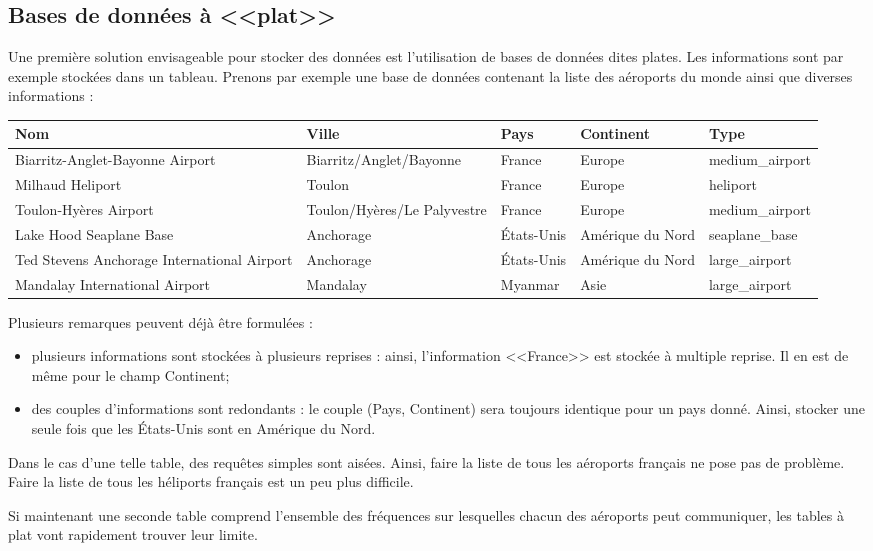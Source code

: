 \documentclass[10pt]{article}
\begin{document}
\subsection{Bases de données à <<plat>>}
Une première solution envisageable pour stocker des données est l'utilisation de bases de données dites plates. Les informations sont par exemple stockées dans un tableau. Prenons par exemple une base de données contenant la liste des aéroports du monde ainsi que diverses informations : 
\begin{center}
\begin{tabular}{p{4cm}llll}
\hline
Nom & Ville & Pays & Continent  & Type \\
\hline
\hline
Biarritz-Anglet-Bayonne Airport & Biarritz/Anglet/Bayonne & France & Europe & medium\_airport \\
Milhaud Heliport & Toulon & France & Europe & heliport \\
Toulon-Hyères Airport & Toulon/Hyères/Le Palyvestre & France & Europe & medium\_airport \\
Lake Hood Seaplane Base & Anchorage & États-Unis & Amérique du Nord & seaplane\_base\\
Ted Stevens Anchorage International Airport & Anchorage & États-Unis & Amérique du Nord & large\_airport\\
Mandalay International Airport & Mandalay & Myanmar & Asie & large\_airport\\
\hline
\end{tabular}
\end{center}

Plusieurs remarques peuvent déjà être formulées : 
\begin{itemize}
\item plusieurs informations sont stockées à plusieurs reprises : ainsi, l'information <<France>> est stockée à multiple reprise. Il en est de même pour le champ Continent;
\item des couples d'informations sont redondants : le couple (Pays, Continent) sera toujours identique pour un pays donné. Ainsi, stocker une seule fois que les États-Unis sont en Amérique du Nord.
\end{itemize}

Dans le cas d'une telle table, des requêtes simples sont aisées. Ainsi, faire la liste de tous les aéroports français ne pose pas de problème. Faire la liste de tous les héliports français est un peu plus difficile. 

Si maintenant une seconde table comprend l'ensemble des fréquences sur lesquelles chacun des aéroports peut communiquer, les tables à plat vont rapidement trouver leur limite. 
\end{document}
